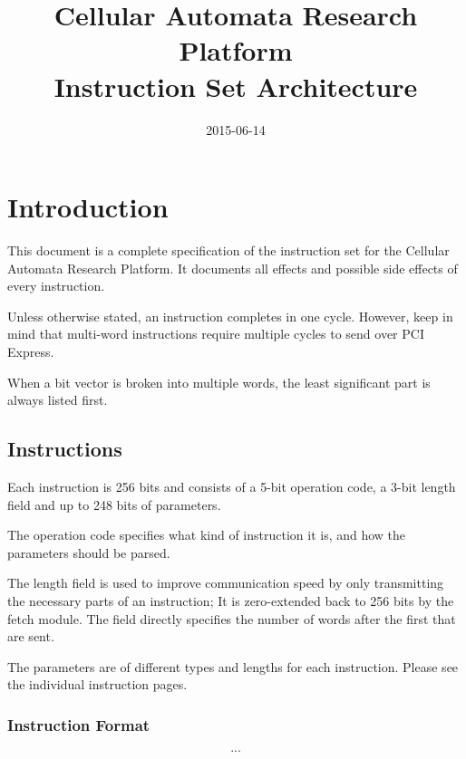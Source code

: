 \documentclass[a4paper,twoside,12pt]{article}
\title{Cellular Automata Research Platform\\Instruction Set Architecture}
\date{2015-06-14}
\begin{document}

\maketitle

\cleardoublepage

\pagestyle{fancy}

\tableofcontents

\cleardoublepage
{}

\section{Introduction}

This document is a complete specification of the instruction set for the Cellular Automata Research Platform.
It documents all effects and possible side effects of every instruction.

Unless otherwise stated, an instruction completes in one cycle.
However, keep in mind that multi-word instructions require multiple cycles to send over PCI Express.

When a bit vector is broken into multiple words, the least significant part is always listed first.

\clearpage
\subsection{Instructions}

Each instruction is 256 bits and consists of a 5-bit operation code, a 3-bit length field and up to 248 bits of parameters.

The operation code specifies what kind of instruction it is, and how the parameters should be parsed.

The length field is used to improve communication speed by only transmitting the necessary parts of an instruction;
It is zero-extended back to 256 bits by the fetch module.
The field directly specifies the number of words after the first that are sent.

The parameters are of different types and lengths for each instruction.
Please see the individual instruction pages.

\subsubsection*{Instruction Format}

$$...$$
\end{document}

